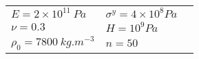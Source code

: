\begin{tabular}{l|lN}
    \hline
    $E=2\times 10^{11}\:Pa$ & $\sigma^y=4 \times 10^8 Pa$ &\\ [3pt]
    $\nu=0.3$ & $H=10^{9} Pa$ & \\[3pt]
    $\rho_0 = 7800 \: kg.m^{-3}$ & $n= 50$& \\[3pt]
    \hline
\end{tabular}